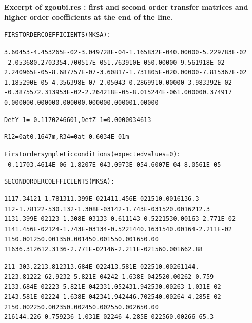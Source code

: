 \begin{tiny}
\noindent \textbf{\normalsize Excerpt of zgoubi.res  : first and second order transfer matrices and higher 
order coefficients at the end of the line}.

\begin{alltt}
               FIRST  ORDER  COEFFICIENTS  ( MKSA ):

           3.60453       -4.453265E-02   -3.049728E-04   -1.165832E-04     0.00000       -5.229783E-02
          -2.05368        0.270335        4.700517E-05    1.763910E-05     0.00000       -9.561918E-02
          2.240965E-05   -8.687757E-07    -3.60817       -1.731805E-02     0.00000       -7.815367E-02
          1.185290E-05   -4.356398E-07    -2.05043       -0.286991         0.00000       -3.983392E-02
         -0.387557        2.313953E-02   -2.264218E-05   -8.015244E-06     1.00000        0.374917
           0.00000         0.00000         0.00000         0.00000         0.00000         1.00000

          DetY-1 =      -0.1170246601,    DetZ-1 =       0.0000034613

          R12=0 at   0.1647     m,        R34=0 at  -0.6034E-01 m

      First order sympletic conditions (expected values = 0) :
        -0.1170        3.4614E-06   -1.8207E-04    3.0973E-05    4.6007E-04   -8.0561E-05

               SECOND  ORDER  COEFFICIENTS  ( MKSA ):

   1 11   7.34       1 21  -1.78       1 31  1.399E-02   1 41  1.456E-02   1 51   0.00       1 61   36.3
   1 12  -1.78       1 22  -530.       1 32 -1.308E-03   1 42 -1.743E-03   1 52   0.00       1 62   12.3
   1 13  1.399E-02   1 23 -1.308E-03   1 33 -0.611       1 43 -0.522       1 53   0.00       1 63 -2.771E-02
   1 14  1.456E-02   1 24 -1.743E-03   1 34 -0.522       1 44  0.163       1 54   0.00       1 64 -2.211E-02
   1 15   0.00       1 25   0.00       1 35   0.00       1 45   0.00       1 55   0.00       1 65   0.00
   1 16   36.3       1 26   12.3       1 36 -2.771E-02   1 46 -2.211E-02   1 56   0.00       1 66   2.88


   2 11  -303.       2 21   3.81       2 31  3.684E-02   2 41  3.581E-02   2 51   0.00       2 61   144.
   2 12   3.81       2 22  -62.9       2 32 -5.821E-04   2 42 -1.638E-04   2 52   0.00       2 62 -0.759
   2 13  3.684E-02   2 23 -5.821E-04   2 33   1.05       2 43   1.94       2 53   0.00       2 63 -1.031E-02
   2 14  3.581E-02   2 24 -1.638E-04   2 34   1.94       2 44   6.70       2 54   0.00       2 64 -4.285E-02
   2 15   0.00       2 25   0.00       2 35   0.00       2 45   0.00       2 55   0.00       2 65   0.00
   2 16   144.       2 26 -0.759       2 36 -1.031E-02   2 46 -4.285E-02   2 56   0.00       2 66  -65.3



\end{alltt}
\end{tiny}
